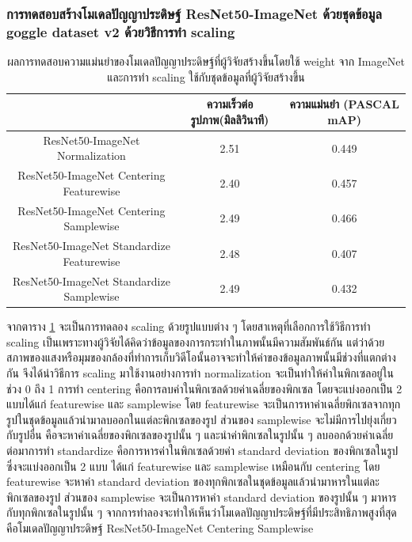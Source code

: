 \subsubsection{การทดสอบสร้างโมเดลปัญญาประดิษฐ์ ResNet50-ImageNet ด้วยชุดข้อมูล goggle dataset v2 ด้วยวิธีการทำ scaling}
\begin{table}[!ht]
	\centering
	\begin{tabular}{|c|c|c|}
			\hline
			{}&{ความเร็วต่อรูปภาพ(มิลลิวินาที)}&{ความแม่นยำ (PASCAL mAP)}			\\
			\hline
			ResNet50-ImageNet	 Normalization				& 2.51			& 0.449				\\
			ResNet50-ImageNet	 Centering Featurewise		& 2.40			& 0.457				\\
			ResNet50-ImageNet	 Centering Samplewise		& 2.49			& 0.466				\\
			ResNet50-ImageNet	 Standardize Featurewise		& 2.48			& 0.407				\\
			ResNet50-ImageNet	 Standardize Samplewise		& 2.49			& 0.432				\\
			\hline
	\end{tabular}
\caption{ผลการทดสอบความแม่นยำของโมเดลปัญญาประดิษฐ์ที่ผู้วิจัยสร้างขึ้นโดยใช้ weight จาก ImageNet และการทำ scaling ใช้กับชุดข้อมูลที่ผู้วิจัยสร้างขึ้น}
\label{tab: Test PASCAL mAP of dataset created by the researcher with pretrain weight imagenet and scaling}
\end{table}

จากตาราง \ref{tab: Test PASCAL mAP of dataset created by the researcher with pretrain weight imagenet and scaling} จะเป็นการทดลอง scaling ด้วยรูปแบบต่าง ๆ โดยสาเหตุที่เลือกการใช้วิธีการทำ scaling เป็นเพราะทางผู้วิจัยได้คิดว่าข้อมูลของการกระทำในภาพนั้นมีความสัมพันธ์กัน แต่ว่าด้วยสภาพของแสงหรือมุมของกล้องที่ทำการเก็บวิดีโอนั้นอาจจะทำให้ค่าของข้อมูลภาพนั้นมีช่วงที่แตกต่างกัน จึงได้นำวิธีการ scaling มาใช้งานอย่างการทำ normalization จะเป็นทำให้ค่าในพิกเซลอยู่ในช่วง 0 ถึง 1 การทำ centering คือการลบค่าในพิกเซลด้วยค่าเฉลี่ยของพิกเซล โดยจะแบ่งออกเป็น 2 แบบได้แก่ featurewise และ samplewise โดย featurewise จะเป็นการหาค่าเฉลี่ยพิกเซลจากทุกรูปในชุดข้อมูลแล้วนำมาลบออกในแต่ละพิกเซลของรูป ส่วนของ samplewise จะไม่มีการไปยุ่งเกี่ยวกับรูปอื่น คือจะหาค่าเฉลี่ยของพิกเซลของรูปนั้น ๆ และนำค่าพิกเซลในรูปนั้น ๆ ลบออกด้วยค่าเฉลี่ย ต่อมาการทำ standardize คือการหารค่าในพิกเซลด้วยค่า standard deviation ของพิกเซลในรูป ซึ่งจะแบ่งออกเป็น 2 แบบ ได้แก่ featurewise และ samplewise เหมือนกับ centering โดย featurewise จะหาค่า standard deviation ของทุกพิกเซลในชุดข้อมูลแล้วนำมาหารในแต่ละพิกเซลของรูป ส่วนของ samplewise จะเป็นการหาค่า standard deviation ของรูปนั้น ๆ มาหารกับทุกพิกเซลในรูปนั้น ๆ จากการทำลองจะทำให้เห็นว่าโมเดลปัญญาประดิษฐ์ที่มีประสิทธิภาพสูงที่สุดคือโมเดลปัญญาประดิษฐ์ ResNet50-ImageNet	 Centering Samplewise
\clearpage
